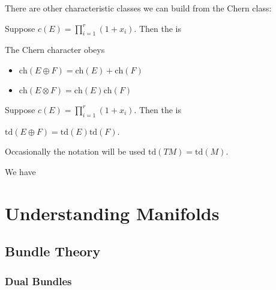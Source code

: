 \documentclass{article}
\begin{document}
There are other characteristic classes we can build from the Chern class:
\begin{definition}
	Suppose $c(E) = \prod_{i=1}^r (1+x_i)$. Then the  is 
\end{definition}
\begin{prop}
	The Chern character obeys
	\begin{itemize}
		\item $\text{ch}(E \oplus F) = \text{ch}(E) + \text{ch}(F)$ 
		\item $\text{ch}(E \otimes F) = \text{ch}(E) \text{ch}(F)$
	\end{itemize}
\end{prop}

\begin{definition}
	Suppose $c(E) = \prod_{i=1}^r (1+x_i)$. Then the  is
\end{definition}
\begin{prop}
$\text{td}(E \oplus F) = \text{td}(E) \text{td}(F)$. 	
\end{prop}
\begin{remark}
	Occasionally the notation will be used $\text{td}(TM) = \text{td}(M)$. 
\end{remark}

\begin{theorem}
	We have 
\end{theorem}

\section{Understanding Manifolds}
\subsection{Bundle Theory}

\subsubsection{Dual Bundles}
\end{document}
